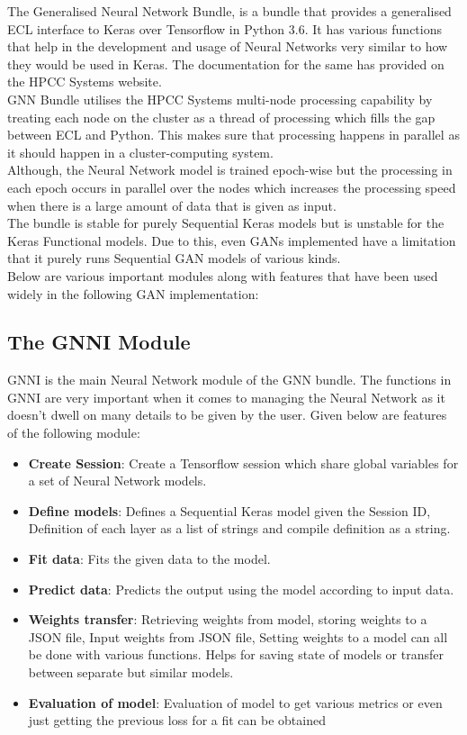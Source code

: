 \documentclass[conference]{IEEEtran}
\begin{document}
The Generalised Neural Network Bundle, is a bundle that provides a generalised ECL interface to Keras over Tensorflow in Python 3.6. It has various functions that help in the development and usage of Neural Networks very similar to how they would be used in Keras. The documentation for the same has provided on the HPCC Systems website\cite{gnnpaper}.
\\
GNN Bundle utilises the HPCC Systems multi-node processing capability by treating each node on the cluster as a thread of processing which fills the gap between ECL and Python. This makes sure that processing happens in parallel as it should happen in a cluster-computing system. 
\\
Although, the Neural Network model is trained epoch-wise but the processing in each epoch occurs in parallel over the nodes which increases the processing speed when there is a large amount of data that is given as input. 
\\
The bundle is stable for purely Sequential Keras models but is unstable for the Keras Functional models. Due to this, even GANs implemented have a limitation that it purely runs Sequential GAN models of various kinds.
\\
Below are various important modules along with features that have been used widely in the following GAN implementation:

\subsection{The GNNI Module}

GNNI is the main Neural Network module of the GNN bundle. The functions in GNNI are very important when it comes to managing the Neural Network as it doesn't dwell on many details to be given by the user. Given below are features of the following module:

\begin{itemize}
    \item \textbf{Create Session}: Create a Tensorflow session which share global variables for a set of Neural Network models.
    \item \textbf{Define models}: Defines a Sequential Keras model given the Session ID, Definition of each layer as a list of strings and compile definition as a string.
    \item \textbf{Fit data}: Fits the given data to the model.
    \item \textbf{Predict data}: Predicts the output using the model according to input data.
    \item \textbf{Weights transfer}: Retrieving weights from model, storing weights to a JSON file, Input weights from JSON file, Setting weights to a model can all be done with various functions. Helps for saving state of models or transfer between separate but similar models.
    \item \textbf{Evaluation of model}: Evaluation of model to get various metrics or even just getting the previous loss for a fit can be obtained
\end{itemize}
\end{document}
